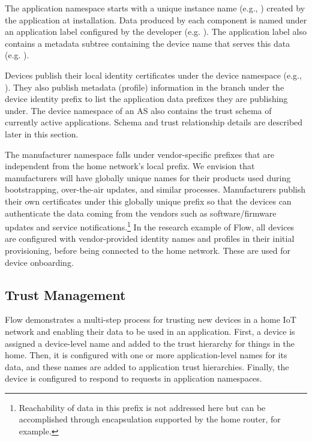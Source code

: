 The application namespace starts with a unique instance name (e.g., ) created by the application at installation. 
Data produced by each component is named under an application label configured by the developer (e.g. ). The application label also contains a metadata subtree containing the device name that serves this data (e.g. ).

Devices publish their local identity certificates under the device namespace (e.g., ).
They also publish metadata (profile) information in the  branch under the device identity prefix to list the application data prefixes they are publishing under. 
The device namespace of an AS also contains the trust schema of currently active applications. 
Schema and trust relationship details are described later in this section.

The manufacturer namespace falls under vendor-specific prefixes that are independent from the home network's local prefix.  We envision that manufacturers will have globally unique names for their products used during  bootstrapping, over-the-air updates, and similar processes. 
Manufacturers publish their own certificates under this globally unique prefix so that the devices can authenticate the data coming from the vendors such as software/firmware updates and service notifications.\footnote{Reachability of data in this prefix is not addressed here but can be accomplished through encapsulation supported by the home router, for example.}
In the research example of Flow, all devices are configured with vendor-provided identity names and profiles in their initial provisioning, before being connected to the home network. These are used for device onboarding.

\subsection{Trust Management}
\label{sec:trust-management}

Flow demonstrates a multi-step process for trusting new devices in a home IoT network and enabling their data to be used in an application.  First, a device is assigned a device-level name and added to the trust hierarchy for things in the home. Then, it is configured with one or more application-level names for its data, and these names are added to application trust hierarchies. Finally, the device is configured to respond to requests in application namespaces. 

